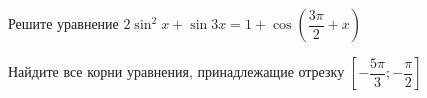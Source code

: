 \begin{ex}
	\begin{condition}
		\begin{enumcols}[label=\asbuk*)]
			\item Решите уравнение \( 2\sin^2 x + \sin 3x = 1+\cos{\left(\dfrac{3\pi}{2}+x\right)} \)
			\item Найдите все корни уравнения, принадлежащие отрезку \( \left[-\dfrac{5\pi}{3};-\dfrac{\pi}{2}\right] \)
		\end{enumcols}
	\end{condition}
\end{ex}